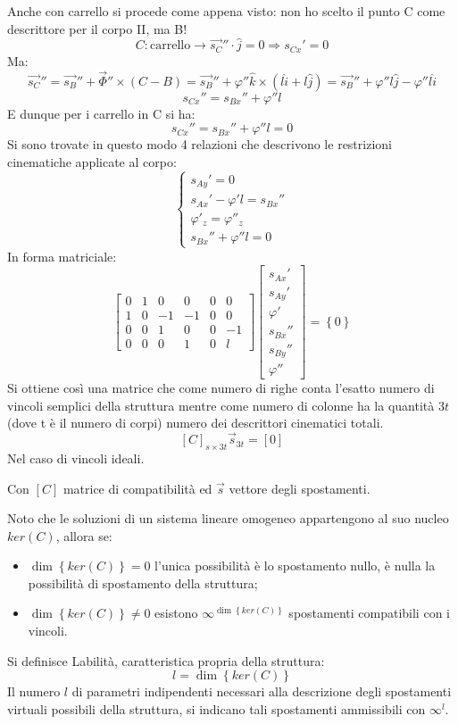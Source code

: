 \documentclass{article}
\begin{document}
\begin{adjustwidth}{2in}{}
Anche con carrello si procede come appena visto: non ho scelto il punto C  come descrittore per il corpo II, ma B!
\[
C : \text{carrello} \rightarrow \vec{s_C}'' \cdot \hat{j} = 0 \Rightarrow s_{Cx}'= 0
\]		
Ma:
\[
\vec{s_C}''= \vec{s_B}''+ \vec{\Phi}'' \times (C-B) = \vec{s_B}'' + \varphi''\hat{k} \times (l\hat{i} + l\hat{j}) = \vec{s_B}'' + \varphi''l\hat{j} - \varphi''l\hat{i}
\]
\[
s_{Cx}''= s_{Bx}''+ \varphi''l
\]		
E dunque per i carrello in C si ha: 
\[
\boxed{s_{Cx}''= s_{Bx}''+ \varphi''l = 0}
\]
Si sono trovate in questo modo 4 relazioni che descrivono le restrizioni cinematiche applicate al corpo: 
\[
\boxed{\begin{cases}
	s_{Ay}'= 0 \\
	s_{Ax}'- \varphi'l = s_{Bx}'' \\
	\varphi'_z = \varphi''_z \\
	s_{Bx}''+ \varphi''l = 0
\end{cases}}
\]		
In forma matriciale: 
\[
\left[\begin{array}{cccccc}
	0 & 1 & 0 & 0 & 0 & 0 \\
	1 & 0 & -1 & -1 & 0 & 0 \\
	0 & 0 & 1 & 0 & 0 & -1 \\
	0 & 0 & 0 & 1 & 0 & l
\end{array} \right] \left[ \begin{array}{c}
s_{Ax}' \\
s_{Ay}' \\
\varphi' \\
s_{Bx}'' \\
s_{By}'' \\
\varphi''
\end{array}\right] = \left\lbrace 0 \right\rbrace 
\]	
Si ottiene così una matrice che come numero di righe conta l'esatto numero di vincoli semplici della struttura mentre come numero di colonne ha la quantità $3t$ {\small (dove t è il numero di corpi)} numero dei descrittori cinematici totali. 
\[
[C]_{s\times 3t}\vec{s}_{3t} = [0]
\]		
Nel caso di vincoli ideali.

Con $[C]$ matrice di compatibilità ed $\vec{s}$ vettore degli spostamenti.

Noto che le soluzioni di un sistema lineare omogeneo appartengono al suo nucleo $ker(C)$, allora se: 
\begin{itemize}
\item $\dim\left\lbrace ker(C) \right\rbrace = 0$ l'unica possibilità è lo spostamento nullo, è nulla la possibilità di spostamento della struttura;
\item $\dim\left\lbrace ker(C) \right\rbrace \ne 0$ esistono $\infty^{\dim\left\lbrace ker(C) \right\rbrace }$ spostamenti compatibili con i vincoli.
\end{itemize}		
Si definisce Labilità, caratteristica propria della struttura:
\[
l = \dim\left\lbrace ker(C) \right\rbrace
\]		
Il numero $l$ di parametri indipendenti necessari alla descrizione degli spostamenti virtuali possibili della struttura, si indicano tali spostamenti ammissibili con $\infty^{l}$. \newline


\end{adjustwidth}
\end{document}
